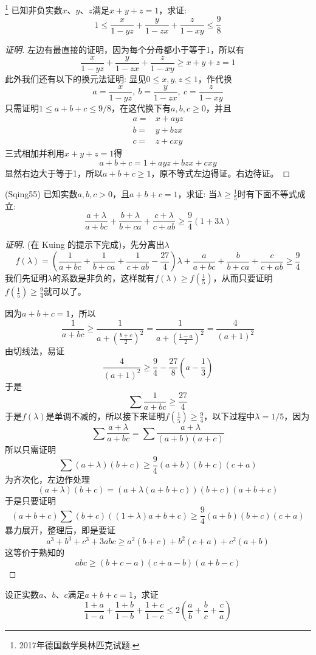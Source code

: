 \begin{exercise}\footnote{2017年德国数学奥林匹克试题.}
  已知非负实数$x$、$y$、$z$满足$x+y+z=1$，求证:
  \[ 1 \leqslant \frac{x}{1-yz}+\frac{y}{1-zx}+\frac{z}{1-xy} \leqslant \frac{9}{8} \]
\end{exercise}

\begin{proof}[证明]
  左边有最直接的证明，因为每个分母都小于等于1，所以有
  \[ \frac{x}{1-yz}+\frac{y}{1-zx}+\frac{z}{1-xy} \geqslant x+y+z = 1 \]
  此外我们还有以下的换元法证明:
  显见$0 \leqslant x,y,z \leqslant 1$，作代换
  \[ a=\frac{x}{1-yz}, \  b=\frac{y}{1-zx}, \  c=\frac{z}{1-xy} \]
  只需证明$1\leqslant a+b+c \leqslant 9/8$，在这代换下有$a,b,c \geqslant 0$，并且
  \begin{align*}
    a = {} & x+ayz \\
    b = {} & y+bzx \\
    c = {} & z+cxy
  \end{align*}
  三式相加并利用$x+y+z=1$得
  \[ a+b+c=1+ayz+bzx+cxy \]
  显然右边大于等于1，所以$a+b+c\geqslant 1$，原不等式左边得证。右边待证。
\end{proof}

\begin{exercise}
  (Sqing55) 已知实数$a,b,c>0$，且$a+b+c=1$，求证: 当$\lambda \geqslant \frac{1}{5}$时有下面不等式成立:
  \[ \frac{a+\lambda}{a+bc} + \frac{b+\lambda}{b+ca} + \frac{c+\lambda}{c+ab} \geqslant \frac{9}{4}(1+3\lambda) \]
  \begin{proof}[证明]
    (在 Kuing 的提示下完成)，先分离出$\lambda$
    \[ f(\lambda) = \left( \frac{1}{a+bc}+\frac{1}{b+ca}+\frac{1}{c+ab}-\frac{27}{4} \right) \lambda + \frac{a}{a+bc}+\frac{b}{b+ca}+\frac{c}{c+ab} \geqslant \frac{9}{4} \]
    我们先证明$\lambda$的系数是非负的，这样就有$f(\lambda)\geqslant f\left( \frac{1}{5} \right)$，从而只要证明$f\left( \frac{1}{5} \right) \geqslant \frac{9}{4}$就可以了。

    因为$a+b+c=1$，所以
    \[ \frac{1}{a+bc} \geqslant \frac{1}{a+\left( \frac{b+c}{2} \right)^2} =
    \frac{1}{a+\left( \frac{1-a}{2} \right)^2} = \frac{4}{(a+1)^2} \]
  由切线法，易证
  \[ \frac{4}{(a+1)^2} \geqslant \frac{9}{4}-\frac{27}{8}\left( a-\frac{1}{3} \right) \]
  于是
  \[ \sum \frac{1}{a+bc} \geqslant \frac{27}{4} \]
  于是$f(\lambda)$是单调不减的，所以接下来证明$f\left( \frac{1}{5} \right) \geqslant \frac{9}{4}$，以下过程中$\lambda=1/5$，因为
  \[ \sum \frac{a+\lambda}{a+bc} = \sum \frac{a+\lambda}{(a+b)(a+c)} \]
  所以只需证明
  \[ \sum (a+\lambda)(b+c) \geqslant \frac{9}{4}(a+b)(b+c)(c+a) \]
  为齐次化，左边作处理
  \[ (a+\lambda)(b+c) = (a+\lambda(a+b+c))(b+c)(a+b+c) \]
  于是只要证明
  \[ (a+b+c)\sum (b+c)((1+\lambda)a+b+c) \geqslant \frac{9}{4}(a+b)(b+c)(c+a) \]
  暴力展开，整理后，即是要证
  \[ a^3+b^3+c^3 +3abc \geqslant a^2(b+c) + b^2(c+a)+c^2(a+b) \]
  这等价于熟知的
  \[ abc \geqslant (b+c-a)(c+a-b)(a+b-c) \]
  \end{proof}
\end{exercise}

\begin{exercise}
  设正实数$a$、$b$、$c$满足$a+b+c=1$，求证
  \[ \frac{1+a}{1-a} + \frac{1+b}{1-b} + \frac{1+c}{1-c} \leqslant 2 \left( \frac{a}{b} + \frac{b}{c} + \frac{c}{a} \right) \]
\end{exercise}


